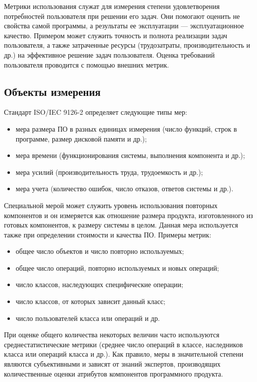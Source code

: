 \documentclass{../../text-style}
\begin{document}
Метрики использования служат для измерения степени удовлетворения потребностей пользователя при решении его задач. Они помогают оценить не свойства самой программы, а результаты ее эксплуатации --- эксплуатационное качество. Примером может служить точность и полнота реализации задач пользователя, а также затраченные ресурсы (трудозатраты, производительность и др.) на эффективное решение задач пользователя. Оценка требований пользователя проводится с помощью внешних метрик.

\subsection{Объекты измерения}

Стандарт ISO/IEC 9126-2 определяет следующие типы мер:

\begin{itemize}
    \item мера размера ПО в разных единицах измерения (число функций, строк в программе, размер дисковой памяти и др.);
    \item мера времени (функционирования системы, выполнения компонента и др.);
    \item мера усилий (производительность труда, трудоемкость и др.);
    \item мера учета (количество ошибок, число отказов, ответов системы и др.).
\end{itemize}

Специальной мерой может служить уровень использования повторных компонентов и он измеряется как отношение размера продукта, изготовленного из готовых компонентов, к размеру системы в целом. Данная мера используется также при определении стоимости и качества ПО. Примеры метрик:

\begin{itemize}
    \item общее число объектов и число повторно используемых;
    \item общее число операций, повторно используемых и новых операций;
    \item число классов, наследующих специфические операции;
    \item число классов, от которых зависит данный класс;
    \item число пользователей класса или операций и др.
\end{itemize}

При оценке общего количества некоторых величин часто используются среднестатистические метрики (среднее число операций в классе, наследников класса или операций класса и др.). Как правило, меры в значительной степени являются субъективными и зависят от знаний экспертов, производящих количественные оценки атрибутов компонентов программного продукта.
\end{document}
